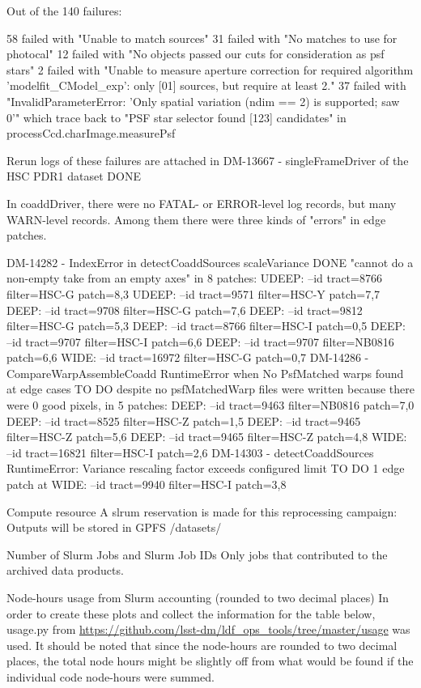 Out of the 140 failures: 

58 failed with "Unable to match sources"
31 failed with "No matches to use for photocal"
12 failed with "No objects passed our cuts for consideration as psf stars"
2 failed with "Unable to measure aperture correction for required algorithm 'modelfit\_CModel\_exp': only [01] sources, but require at least 2."
37 failed with "InvalidParameterError: 'Only spatial variation (ndim == 2) is supported; saw 0'" which trace back to "PSF star selector found [123] candidates" in processCcd.charImage.measurePsf

Rerun logs of these failures are attached in  DM-13667 - singleFrameDriver of the HSC PDR1 dataset DONE


In coaddDriver, there were no FATAL- or ERROR-level log records, but many WARN-level records.  Among them there were three kinds of "errors" in edge patches. 

DM-14282 - IndexError in detectCoaddSources scaleVariance DONE  "cannot do a non-empty take from an empty axes" in 8 patches:   
UDEEP: --id tract=8766 filter=HSC-G patch=8,3 
UDEEP: --id tract=9571 filter=HSC-Y patch=7,7 
DEEP: --id tract=9708 filter=HSC-G patch=7,6 
DEEP: --id tract=9812 filter=HSC-G patch=5,3 
DEEP: --id tract=8766 filter=HSC-I patch=0,5 
DEEP: --id tract=9707 filter=HSC-I patch=6,6 
DEEP: --id tract=9707 filter=NB0816 patch=6,6 
WIDE: --id tract=16972 filter=HSC-G patch=0,7
DM-14286 - CompareWarpAssembleCoadd RuntimeError when No PsfMatched warps found at edge cases TO DO  despite no psfMatchedWarp files were written because there were 0 good pixels, in 5 patches: 
DEEP: --id tract=9463 filter=NB0816 patch=7,0
DEEP: --id tract=8525 filter=HSC-Z patch=1,5
DEEP: --id tract=9465 filter=HSC-Z patch=5,6
DEEP: --id tract=9465 filter=HSC-Z patch=4,8
WIDE: --id tract=16821 filter=HSC-I patch=2,6
DM-14303 - detectCoaddSources RuntimeError: Variance rescaling factor exceeds configured limit TO DO  1 edge patch at 
WIDE: --id tract=9940 filter=HSC-I patch=3,8



Compute resource
A slrum reservation is made for this reprocessing campaign: 
Outputs will be stored in GPFS /datasets/    

Number of Slurm Jobs and Slurm Job IDs
Only jobs that contributed to the archived data products. 


Node-hours usage from Slurm accounting (rounded to two decimal places)
In order to create these plots and collect the information for the table below, usage.py from \url{https://github.com/lsst-dm/ldf_ops_tools/tree/master/usage} was used.  It should be noted that since the node-hours are rounded to two decimal places, the total node hours might be slightly off from what would be found if the individual code node-hours were summed.  


